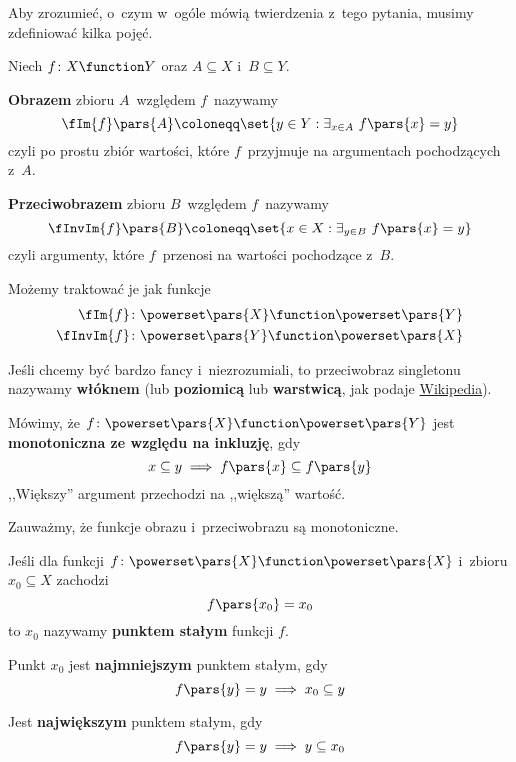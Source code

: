 Aby zrozumieć, o~czym w~ogóle mówią twierdzenia z~tego pytania, musimy zdefiniować kilka pojęć.
\begin{definition}
Niech \(f\colon X \function Y\) oraz \(A \subseteq X\) i~\(B \subseteq Y\).

\textbf{Obrazem} zbioru \(A\)~względem \(f\)~nazywamy
\begin{equation*}
    \fIm{f}\pars{A} \coloneqq \set{y \in Y : \exists_{x \in A} \ f\pars{x} = y}
\end{equation*}
czyli po prostu zbiór wartości, które \(f\)~przyjmuje na argumentach pochodzących z~\(A\).

\textbf{Przeciwobrazem} zbioru \(B\)~względem \(f\)~nazywamy
\begin{equation*}
    \fInvIm{f}\pars{B} \coloneqq \set{x \in X : \exists_{y \in B} \ f\pars{x} = y}
\end{equation*}
czyli argumenty, które \(f\)~przenosi na wartości pochodzące z~\(B\).

Możemy traktować je jak funkcje
\begin{align*}
    \fIm{f}&\colon \powerset\pars{X} \function \powerset\pars{Y}\\
    \fInvIm{f}&\colon \powerset\pars{Y} \function \powerset\pars{X}
\end{align*}

Jeśli chcemy być bardzo fancy i~niezrozumiali, to przeciwobraz singletonu nazywamy \textbf{włóknem} (lub \textbf{poziomicą} lub \textbf{warstwicą}, jak podaje \href{https://pl.wikipedia.org/wiki/Przeciwobraz}{Wikipedia}).
\end{definition}

\begin{definition}[Monotoniczność]
Mówimy, że \(f\colon \powerset\pars{X} \function \powerset\pars{Y}\) jest \textbf{monotoniczna ze względu na inkluzję}, gdy
\begin{equation*}
    x \subseteq y \implies f\pars{x} \subseteq f\pars{y}
\end{equation*}
,,Większy'' argument przechodzi na ,,większą'' wartość.
\end{definition}
Zauważmy, że funkcje obrazu i~przeciwobrazu są monotoniczne.

\begin{definition}
Jeśli dla funkcji \(f\colon \powerset\pars{X} \function \powerset\pars{X}\) i~zbioru \(x_0 \subseteq X\) zachodzi
\begin{equation*}
    f\pars{x_0} = x_0
\end{equation*}
to \(x_0\) nazywamy \textbf{punktem stałym} funkcji \(f\).

Punkt \( x_0 \) jest \textbf{najmniejszym} punktem stałym, gdy
\begin{equation*}
    f\pars{y} = y \implies x_0 \subseteq y
\end{equation*}

Jest \textbf{największym} punktem stałym, gdy
\begin{equation*}
    f\pars{y} = y \implies y \subseteq x_0
\end{equation*}
\end{definition}